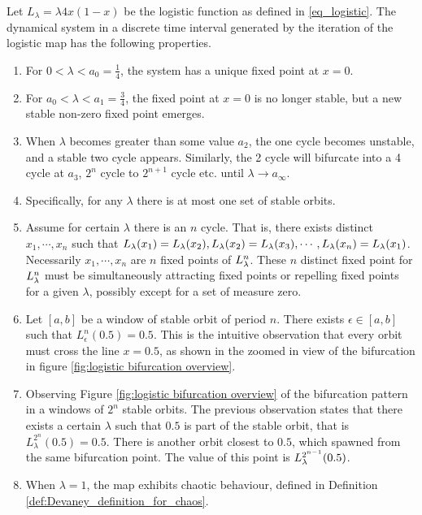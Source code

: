 \begin{observation}\label{th:logistic_bifurcation}
	Let $L_{\lambda} = \lambda 4x(1-x) $ be the logistic function as defined in \eqref{eq_logistic}.
	The dynamical system in a discrete time interval generated by the iteration of the logistic map has the following properties.

	\begin{enumerate}
		\item For $0 < \lambda < a_0 = \frac{1}{4}$, the system has a unique fixed point at $x = 0$. \label{log_fix_0}

		\item For $a_0 <\lambda < a_1 = \frac{3}{4}$, the fixed point at $x=0$ is no longer stable, but a new stable non-zero fixed point emerges. \label{log_fix_1}

		\item When $\lambda$ becomes greater than some value $a_2$, the one cycle becomes unstable, and a stable two cycle appears. 
		Similarly, the 2 cycle will bifurcate into a 4 cycle at $a_3$, $2^n$ cycle to $2^{n+1}$ cycle etc. until $\lambda \rightarrow a_{\infty}$. 
		\label{log_periodic_doubling}
		\item Specifically, for any $\lambda$ there is at most one set of stable orbits. \label{log_at_most_one_stable_orbit}

		\item \label{log_simul_stable_or_unstable}
		Assume for certain $\lambda$ there is an $n$ cycle. That is, there exists distinct $x_1, \cdots, x_n$ such that $L_{\lambda}(x_1) = L_{\lambda}(x_2), L_{\lambda}(x_2) = L_{\lambda}(x_3), \cdots, L_{\lambda}(x_n) = L_{\lambda}(x_1)$.
		Necessarily $x_1, \cdots, x_n$ are $n$ fixed points of $L_{\lambda}^n$. 
		These $n$ distinct fixed point for $L_{\lambda}^n$ must be simultaneously attracting fixed points or repelling fixed points for a given $\lambda$, possibly except for a set of measure zero.

		\item \label{log_cross_half} 
		Let $[a, b]$ be a window of stable orbit of period $n$.
		There exists $\epsilon \in [a, b]$ such that $L_{\epsilon}^n(0.5) = 0.5$. 
		This is the intuitive observation that every orbit must cross the line $x = 0.5$, as shown in the zoomed in view of the bifurcation in figure \ref{fig:logistic bifurcation overview}.

		\item \label{log_closest_branch}
		Observing Figure \ref{fig:logistic bifurcation overview} of the bifurcation pattern in a windows of $2^n$ stable orbits. 
		The previous observation states that there exists a certain $\lambda$ such that $0.5$ is part of the stable orbit, that is $L_{\lambda}^{2^n}(0.5) = 0.5$.
		There is another orbit closest to $0.5$, which spawned from the same bifurcation point.
		The value of this point is $L_{\lambda}^{2^{n-1}}(0.5)$.


		\item  \label{log_chaos_at_1}
			When $\lambda = 1$, the map exhibits chaotic behaviour, defined in Definition \ref{def:Devaney_definition_for_chaos}. 
	\end{enumerate}
\end{observation}

